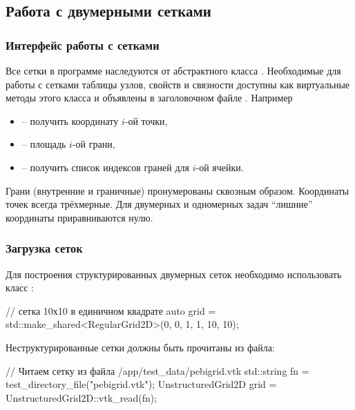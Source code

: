\subsection{Работа с двумерными сетками}
\label{sec:prog_grid}

\subsubsection{Интерфейс работы с сетками}
Все сетки в программе наследуются от абстрактного класса .
Необходимые для работы с сетками таблицы узлов, свойств и связности доступны
как виртуальные методы этого класса и объявлены в заголовочном файле . Например
\begin{itemize}
\item {} -- получить координату $i$-ой точки,
\item {} -- площадь $i$-ой грани,
\item {} -- получить список индексов граней для $i$-ой ячейки.
\end{itemize}
Грани (внутренние и граничные) пронумерованы сквозным образом.
Координаты точек всегда трёхмерные. Для двумерных и одномерных задач ``лишние'' координаты приравниваются нулю.

\subsubsection{Загрузка сеток}
Для построения структурированных двумерных сеток необходимо использовать класс :
\begin{cppcode}
// сетка 10х10 в единичном квадрате
auto grid = std::make_shared<RegularGrid2D>(0, 0, 1, 1, 10, 10);
\end{cppcode}

Неструктурированные сетки должны быть прочитаны из файла:
\begin{cppcode}
// Читаем сетку из файла /app/test_data/pebigrid.vtk
std::string fn = test_directory_file("pebigrid.vtk");
UnstructuredGrid2D grid = UnstructuredGrid2D::vtk_read(fn);
\end{cppcode}

